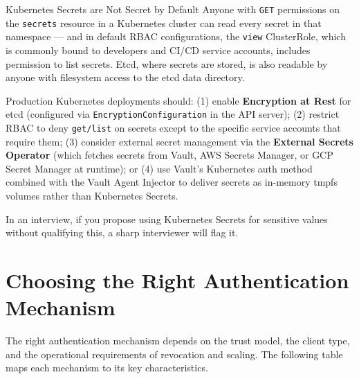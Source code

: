 \documentclass[11pt,a4paper]{article}
\begin{document}
\begin{trapbox}{Kubernetes Secrets are Not Secret by Default}
Anyone with \texttt{GET} permissions on the \texttt{secrets} resource in a Kubernetes cluster can read every secret in that namespace --- and in default RBAC configurations, the \texttt{view} ClusterRole, which is commonly bound to developers and CI/CD service accounts, includes permission to list secrets. Etcd, where secrets are stored, is also readable by anyone with filesystem access to the etcd data directory.

Production Kubernetes deployments should: (1) enable \textbf{Encryption at Rest} for etcd (configured via \texttt{EncryptionConfiguration} in the API server); (2) restrict RBAC to deny \texttt{get/list} on secrets except to the specific service accounts that require them; (3) consider external secret management via the \textbf{External Secrets Operator} (which fetches secrets from Vault, AWS Secrets Manager, or GCP Secret Manager at runtime); or (4) use Vault's Kubernetes auth method combined with the Vault Agent Injector to deliver secrets as in-memory tmpfs volumes rather than Kubernetes Secrets.

In an interview, if you propose using Kubernetes Secrets for sensitive values without qualifying this, a sharp interviewer will flag it.
\end{trapbox}

\section{Choosing the Right Authentication Mechanism}

The right authentication mechanism depends on the trust model, the client type, and the operational requirements of revocation and scaling. The following table maps each mechanism to its key characteristics.
\end{document}

